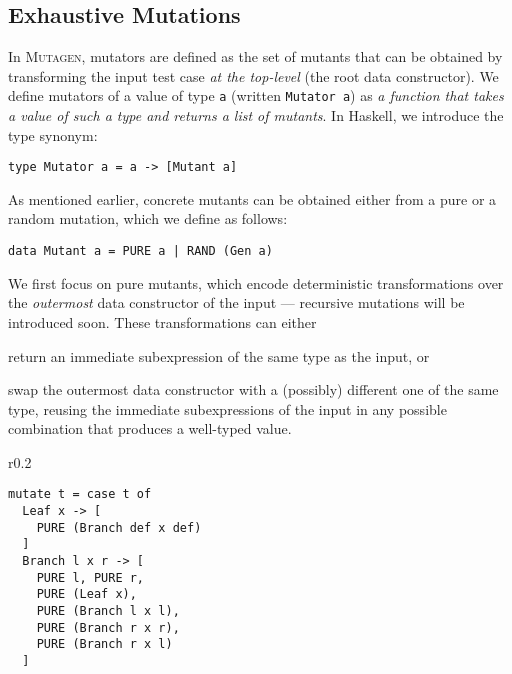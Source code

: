 \documentclass[sigconf,review,anonymous]{acmart}
\newcommand{\fuzzchick}{\textit{FuzzChick}\xspace}
\newcommand{\mutagen}{\textsc{Mutagen}\xspace}
\begin{document}
\subsection{Exhaustive Mutations}


In \mutagen, mutators are defined as the set of mutants that can be obtained by
transforming the input test case \emph{at the top-level} (the root data
constructor).
%
We define mutators of a value of type \texttt{a} (written \texttt{Mutator a}) as
\emph{a function that takes a value of such a type and returns a list of
mutants}.
%
In Haskell, we introduce the type synonym:
%
\begin{verbatim}
type Mutator a = a -> [Mutant a]
\end{verbatim}
%
\noindent As mentioned earlier, concrete mutants can be obtained either from a
pure or a random mutation, which we define as follows:

\begin{verbatim}
data Mutant a = PURE a | RAND (Gen a)
\end{verbatim}

We first focus on pure mutants, which 
%
encode deterministic transformations over the \emph{outermost} data constructor
of the input --- recursive mutations will be introduced soon.
%
These transformations can either
%
\begin{inparaenum}
\item return an immediate subexpression of the same type as the input, or
\item swap the outermost data constructor with a (possibly) different one of the
  same type, reusing the immediate subexpressions of the input in any possible
  combination that produces a well-typed value.  
\end{inparaenum}


\setlength{\intextsep}{10pt}%
\setlength{\columnsep}{10pt}%
\begin{wrapfigure}{r}{0.2\textwidth}
\vspace{-20pt}
\begin{verbatim}
mutate t = case t of 
  Leaf x -> [ 
    PURE (Branch def x def)
  ]
  Branch l x r -> [ 
    PURE l, PURE r, 
    PURE (Leaf x), 
    PURE (Branch l x l),
    PURE (Branch r x r),
    PURE (Branch r x l)
  ]
\end{verbatim}
\vspace{-10pt}
\caption{\label{fig:mutagen:mutator}\mutagen mutator for the \texttt{Tree} data
  type.}
\vspace{-10pt}
\end{wrapfigure}
\end{document}
